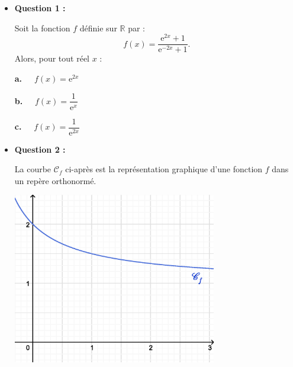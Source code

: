 \begin{itemize}
     \item \textbf{Question 1 :}
     \par
     Soit la fonction $f$ définie sur $\mathbb{R}$ par :
     \[ f(x)=\dfrac{\text{e}^{2x}+1}{\text{e}^{-2x}+1}. \]
     Alors, pour tout réel $x$ :
     \par
     \textbf{a.~~} $f(x)=\text{e}^{2x}$
     \par
     \textbf{b.~~}  $f(x)=\dfrac{1}{\text{e}^{x}}$
     \par
     \textbf{c.~~}  $f(x)=\dfrac{1}{\text{e}^{2x}}$
     \par
     \vspace{5mm}
     \item \textbf{Question 2 :}
     \par
     La courbe $\mathscr{C}_f$ ci-après est la représentation graphique d'une fonction $f$ dans un repère orthonormé.
     \begin{center}
          \begin{extern}%
               \includegraphics[width=0.7\textwidth]{images/BBESL-s4-1-1}%
          \end{extern}
     \end{center}


\end{itemize}
